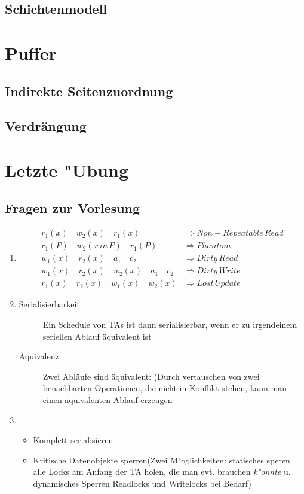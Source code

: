 \documentclass[a4paper, 12pt]{scrartcl}
\begin{document}
\subsection{Schichtenmodell}
\section{Puffer}
\subsection{Indirekte Seitenzuordnung}
\subsection{Verdrängung}

\section{Letzte "Ubung}
\subsection{Fragen zur Vorlesung}

\begin{enumerate}
	\item
		\begin{align*}
			r_1(x) \quad w_2(x) \quad r_1(x) &\Rightarrow Non-Repeatable\, Read\\
			r_1(P) \quad w_2(x\, in\, P) \quad r_1(P) &\Rightarrow Phantom\\
			w_1(x) \quad r_2(x) \quad a_1 \quad c_2 &\Rightarrow Dirty\, Read\\
			w_1(x) \quad r_2(x) \quad w_2(x) \quad a_1 \quad c_2 &\Rightarrow Dirty\, Write\\
			r_1(x) \quad r_2(x) \quad w_1(x) \quad w_2(x) &\Rightarrow Lost\, Update
		\end{align*}

	\item
		\begin{description}
			\item[Serialisierbarkeit] Ein Schedule von TAs ist dann serialisierbar, wenn er zu irgendeinem seriellen Ablauf äquivalent ist
			\item[Äquivalenz]Zwei Abläufe sind äquivalent: (Durch vertauschen von zwei benachbarten Operationen, die nicht in Konflikt stehen, kann man einen äquivalenten Ablauf erzeugen
		\end{description}
	\item
		\begin{itemize}
			\item
			 Komplett serialisieren
		 \item
			 Kritische Datenobjekte sperren(Zwei M"oglichkeiten: statisches speren = alle Locks am Anfang der TA holen, die man evt. brauchen \emph{k"onnte} u. dynamisches Sperren Readlocks und Writelocks bei Bedarf)
		\end{itemize}
\end{enumerate}
\end{document}
